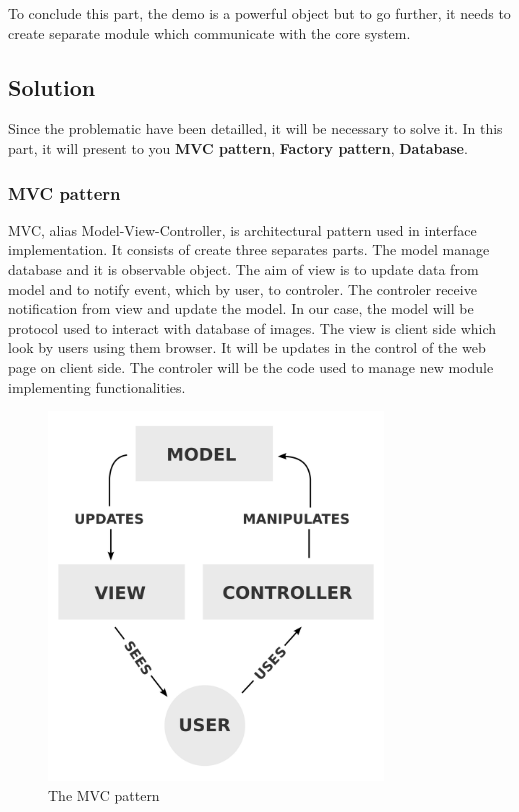 To conclude this part, the demo is a powerful object but to go further, it needs to create
separate module which communicate with the core system.

\subsection{Solution}
\setlength{\parindent}{1cm}
\hspace{1cm}

Since the problematic have been detailled, it will be necessary to solve it. In this part,
it will present to you \textbf{MVC pattern}, \textbf{Factory pattern}, \textbf{Database}.

\subsubsection{MVC pattern}
\setlength{\parindent}{1cm}
\hspace{1cm}


MVC, alias Model-View-Controller, is architectural pattern used in interface implementation.
It consists of create three separates parts. The model manage database and it is observable
object. The aim of view is to update data from model and to notify event, which by user,
to controler. The controler receive notification from view and update the model.
\setlength{\parindent}{0cm}
In our case, the model will be protocol used to interact with database of images.
The view is client side which look by users using them browser.
It will be updates in the control of the web page on client side.
The controler will be the code used to manage new module implementing functionalities.



\begin{figure}[H]
  \centering
  \includegraphics[width=3.5in]{blobs/images/MVC-Process}
  \caption{The MVC pattern}
  \label{img:MVC-Process}
\end{figure}

